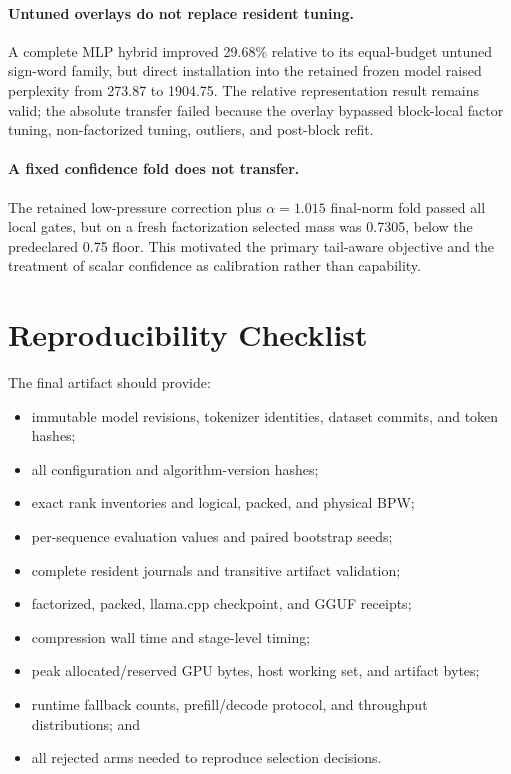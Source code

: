 \documentclass[10pt]{article}
\begin{document}
\paragraph{Untuned overlays do not replace resident tuning.}
A complete MLP hybrid improved 29.68\% relative to its equal-budget untuned
sign-word family, but direct installation into the retained frozen model
raised perplexity from 273.87 to 1904.75. The relative representation result
remains valid; the absolute transfer failed because the overlay bypassed
block-local factor tuning, non-factorized tuning, outliers, and post-block
refit.

\paragraph{A fixed confidence fold does not transfer.}
The retained low-pressure correction plus $\alpha=1.015$ final-norm fold
passed all local gates, but on a fresh factorization selected mass was 0.7305,
below the predeclared 0.75 floor. This motivated the primary tail-aware
objective and the treatment of scalar confidence as calibration rather than
capability.

\section{Reproducibility Checklist}

The final artifact should provide:
\begin{itemize}
  \item immutable model revisions, tokenizer identities, dataset commits, and
  token hashes;
  \item all configuration and algorithm-version hashes;
  \item exact rank inventories and logical, packed, and physical BPW;
  \item per-sequence evaluation values and paired bootstrap seeds;
  \item complete resident journals and transitive artifact validation;
  \item factorized, packed, llama.cpp checkpoint, and GGUF receipts;
  \item compression wall time and stage-level timing;
  \item peak allocated/reserved GPU bytes, host working set, and artifact bytes;
  \item runtime fallback counts, prefill/decode protocol, and throughput
  distributions; and
  \item all rejected arms needed to reproduce selection decisions.
\end{itemize}



\end{document}
